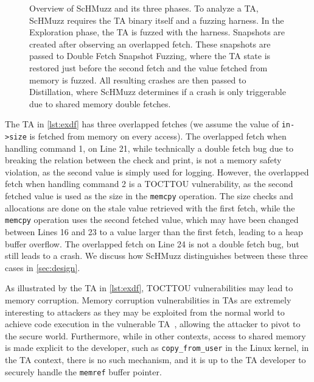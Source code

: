 \documentclass[letterpaper,twocolumn,10pt]{article}
\newcommand{\sysname}{ScHMuzz\xspace}
\newcommand{\stageone}{Exploration\xspace}
\newcommand{\stagetwo}{Double Fetch Snapshot Fuzzing\xspace}
\newcommand{\stagethree}{Distillation\xspace}
\begin{document}
\begin{figure}[h!]
  \centering
  
  \caption{
    Overview of \sysname and its three phases. To analyze a TA, \sysname requires the TA binary itself and a fuzzing harness. In the \stageone phase, the TA is fuzzed with the harness. Snapshots are created after observing an overlapped fetch. These snapshots are passed to \stagetwo, where the TA state is restored just before the second fetch and the value fetched from memory is fuzzed. All resulting crashes 
    are then passed to \stagethree, where \sysname determines if a crash is only triggerable due to shared memory double fetches.
    }
  \label{fig:overview}
\end{figure}

The TA in \autoref{lst:exdf} has three overlapped fetches (we assume the value of \texttt{in->size} is fetched from memory 
on every access). The overlapped
fetch when handling command 1, on Line 21, while technically a double fetch bug due to breaking the relation 
between the check and print, is not a memory safety violation, as the second value is simply 
used for logging. However, the overlapped fetch when handling command 2 is a TOCTTOU vulnerability, as the 
second fetched value is used as the size in the \texttt{memcpy} operation. The size checks and allocations are done on the 
stale value retrieved with the first fetch, while the \texttt{memcpy} operation uses the second fetched 
value, which may have been changed between Lines 16 and 23 to a value larger than 
the first fetch, leading to a heap buffer overflow. The overlapped fetch on Line 24 is not a 
double fetch bug, but still leads to a crash. We discuss how \sysname distinguishes between 
these three cases in \autoref{sec:design}.

As illustrated by the TA in \autoref{lst:exdf}, TOCTTOU vulnerabilities may lead to memory 
corruption. Memory corruption vulnerabilities in TAs are extremely interesting 
to attackers as they may be exploited from the normal world to achieve code execution 
in the vulnerable TA~\cite{fiasccco,beniaini2017trustissues,berard2018kinibi,busch2020finding,rollback,globalconfusion,Komaromy2021UnboxYourPhone,Li2024DiveIntoAndroidTA,AdamskiGuilbonPeterlin2019SamsungTrustZone,Makkaveev2019TrustZoneFuzzing,AdamTC}, allowing the attacker to pivot to the secure world.
Furthermore, while in other contexts, access to shared memory is made explicit to 
the developer, such as \texttt{copy\_from\_user} in the Linux kernel, in the TA 
context, there is no such mechanism, and it is up to the TA developer to securely  
handle the \texttt{memref} buffer pointer. 
\end{document}
